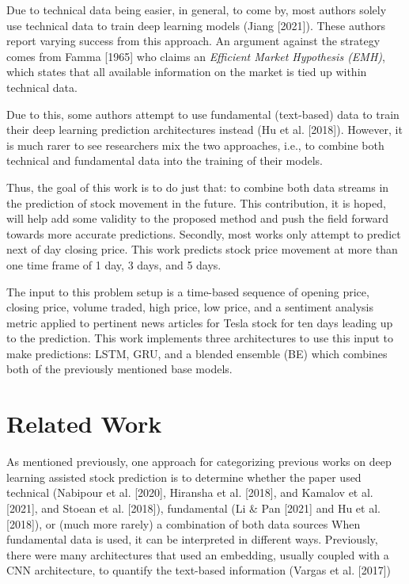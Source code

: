 \documentclass{article}
\begin{document}
Due to technical data being easier, in general, to come by, most authors
solely use technical data to train deep learning models (Jiang [2021]).
These authors report varying success from this approach. An argument against the
strategy comes from Famma [1965] who claims an \textit{Efficient Market
Hypothesis (EMH)}, which states that all available information on the market is
tied up within technical data.

Due to this, some authors attempt to use fundamental (text-based) data to train
their deep learning prediction architectures instead (Hu et al. [2018]).
However, it is much rarer to see researchers mix the two approaches, i.e., to
combine both technical and fundamental data into the training of their models.

Thus, the goal of this work is to do just that: to combine both data streams in
the
prediction of stock movement in the future. This contribution, it is hoped, will help
add some validity to the proposed method and push the field forward towards more
accurate predictions. Secondly, most works only attempt to predict next of day
closing price. This work predicts stock price movement at more than one time
frame of 1 day, 3 days, and 5 days.

The input to this problem setup is a time-based sequence of
opening price, closing price, volume traded, high price, low price, and a
sentiment analysis metric applied to pertinent news articles for Tesla stock for ten days
leading up to the prediction. This work implements three architectures to use this
input to make predictions: LSTM, GRU, and a blended ensemble (BE)
which combines both of the previously mentioned base models.

\section{Related Work}

As mentioned previously, one approach for categorizing previous works on deep
learning assisted stock prediction is to determine whether the paper used
technical (Nabipour et al. [2020], Hiransha et al. [2018], and Kamalov et al.
[2021], and Stoean et al. [2018]), fundamental (Li \& Pan [2021] and Hu et al. [2018]), or (much more rarely) a combination of both data sources
When fundamental data is used, it can be interpreted in different ways.
Previously, there were many architectures that used an embedding,
usually coupled with a CNN architecture, to quantify the text-based information
(Vargas et al. [2017])
\end{document}
